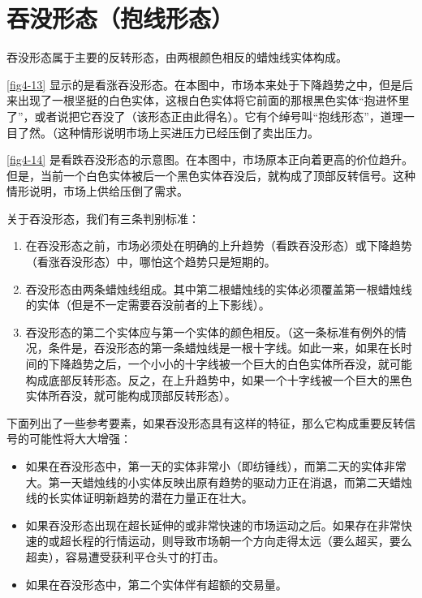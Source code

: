 \section{吞没形态（抱线形态）}
吞没形态属于主要的反转形态，由两根颜色相反的蜡烛线实体构成。

\autoref{fig4-13} 显示的是看涨吞没形态。在本图中，市场本来处于下降趋势之中，但是后来出现了一根坚挺的白色实体，这根白色实体将它前面的那根黑色实体“抱进怀里了”，或者说把它吞没了（该形态正由此得名）。它有个绰号叫“抱线形态”，道理一目了然。（这种情形说明市场上买进压力已经压倒了卖出压力。


\autoref{fig4-14} 是看跌吞没形态的示意图。在本图中，市场原本正向着更高的价位趋升。但是，当前一个白色实体被后一个黑色实体吞没后，就构成了顶部反转信号。这种情形说明，市场上供给压倒了需求。


关于吞没形态，我们有三条判别标准：
\begin{enumerate}
    \item 在吞没形态之前，市场必须处在明确的上升趋势（看跌吞没形态）或下降趋势（看涨吞没形态）中，哪怕这个趋势只是短期的。
    \item 吞没形态由两条蜡烛线组成。其中第二根蜡烛线的实体必须覆盖第一根蜡烛线的实体（但是不一定需要吞没前者的上下影线）。
    \item 吞没形态的第二个实体应与第一个实体的颜色相反。（这一条标准有例外的情况，条件是，吞没形态的第一条蜡烛线是一根十字线。如此一来，如果在长时间的下降趋势之后，一个小小的十字线被一个巨大的白色实体所吞没，就可能构成底部反转形态。反之，在上升趋势中，如果一个十字线被一个巨大的黑色实体所吞没，就可能构成顶部反转形态）。
\end{enumerate}

下面列出了一些参考要素，如果吞没形态具有这样的特征，那么它构成重要反转信号的可能性将大大增强：
\begin{itemize}
    \item 如果在吞没形态中，第一天的实体非常小（即纺锤线），而第二天的实体非常大。第一天蜡烛线的小实体反映出原有趋势的驱动力正在消退，而第二天蜡烛线的长实体证明新趋势的潜在力量正在壮大。
    \item 如果吞没形态出现在超长延伸的或非常快速的市场运动之后。如果存在非常快速的或超长程的行情运动，则导致市场朝一个方向走得太远（要么超买，要么超卖），容易遭受获利平仓头寸的打击。
    \item 如果在吞没形态中，第二个实体伴有超额的交易量。
\end{itemize}

